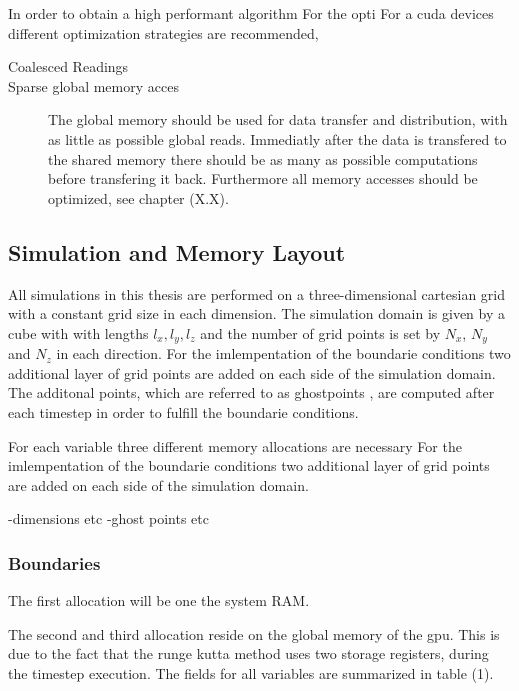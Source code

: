 In order to obtain a high performant algorithm
For the opti
For a cuda devices different optimization strategies are recommended,

\begin{description}
    \item[Coalesced Readings]
    \item[Sparse global memory acces]{
        The global memory should be used for data transfer and distribution, with as little as possible global reads.
        Immediatly after the data is transfered to the shared memory there should be as many as possible computations before transfering
        it back. Furthermore all memory accesses should be optimized, see chapter (X.X).}
    \end{description}


\subsection{Simulation and  Memory Layout}

All simulations in this thesis are performed on a three-dimensional cartesian grid
with a constant grid size  in each dimension.
The simulation domain is given by a cube with with lengths $l_x, l_y, l_z$
and the number of grid points is set by $N_x$, $N_y$ and $N_z$ in each direction.
For the imlempentation of the boundarie conditions  two additional layer of grid points
are added on each side of the simulation domain.
The additonal points, which are referred to as ghostpoints \citep{ctie},
are computed after each timestep in order to fulfill the boundarie conditions.

For each variable three different memory allocations are necessary
For the imlempentation of the boundarie conditions  two additional layer of grid points
are added on each side of the simulation domain.




-dimensions etc
-ghost points etc

\subsubsection{Boundaries}


\label{cuda:prepro}


The first allocation will be one the system RAM.

The second and third allocation reside on the global memory of the gpu.
This is due to the fact that the runge kutta method uses two storage registers, during the timestep execution.
The fields for all variables are summarized in table (1).

